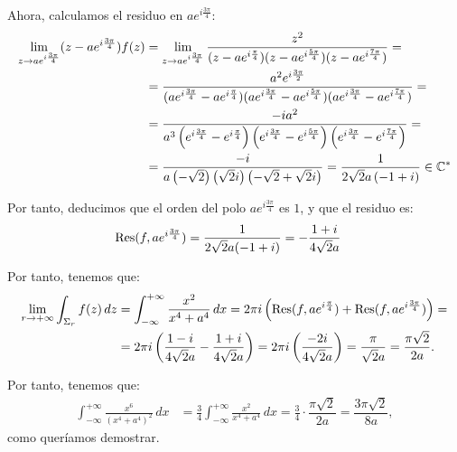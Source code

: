 \begin{ejercicio}
    Ahora, calculamos el residuo en $a e^{i\frac{3\pi}{4}}$:
    \begin{align*}
        \lim_{z\to a e^{i\frac{3\pi}{4}}} (z - a e^{i\frac{3\pi}{4}})f(z) &= \lim_{z\to a e^{i\frac{3\pi}{4}}} \frac{z^2}{(z-a e^{i\frac{\pi}{4}})(z-a e^{i\frac{5\pi}{4}})(z-a e^{i\frac{7\pi}{4}})}
        =\\&= \dfrac{a^2e^{i\frac{3\pi}{2}}}{(a e^{i\frac{3\pi}{4}} - a e^{i\frac{\pi}{4}})(a e^{i\frac{3\pi}{4}} - a e^{i\frac{5\pi}{4}})(a e^{i\frac{3\pi}{4}} - a e^{i\frac{7\pi}{4}})}
        =\\&= \dfrac{-ia^2}{a^3\left(e^{i\frac{3\pi}{4}} - e^{i\frac{\pi}{4}}\right)\left(e^{i\frac{3\pi}{4}} - e^{i\frac{5\pi}{4}}\right)\left(e^{i\frac{3\pi}{4}} - e^{i\frac{7\pi}{4}}\right)}
        =\\&= \dfrac{-i}{a\left(-\sqrt{2}\right)\left(\sqrt{2}i\right)\left(-\sqrt{2} + \sqrt{2}i\right)}
        = \dfrac{1}{2\sqrt{2}a\left(-1 + i\right)}\in \mathbb{C}^*
    \end{align*}

    Por tanto, deducimos que el orden del polo $a e^{i\frac{3\pi}{4}}$ es $1$, y que el residuo es:
    \begin{align*}
        \operatorname{Res}(f, a e^{i\frac{3\pi}{4}}) &= \dfrac{1}{2\sqrt{2}a(-1 + i)}
        = -\dfrac{1+i}{4\sqrt{2}a}
    \end{align*}

    Por tanto, tenemos que:
    \begin{align*}
        \lim_{r\to+\infty} \int_{\Sigma_r} f(z) \, dz &= \int_{-\infty}^{+\infty} \frac{x^2}{x^4 + a^4} \, dx
        = 2\pi i\left(\operatorname{Res}(f, a e^{i\frac{\pi}{4}}) + \operatorname{Res}(f, a e^{i\frac{3\pi}{4}})\right)
        =\\&= 2\pi i\left(\dfrac{1-i}{4\sqrt{2}a} - \dfrac{1+i}{4\sqrt{2}a}\right)
        = 2\pi i\left(\dfrac{-2i}{4\sqrt{2}a}\right)
        = \dfrac{\pi}{\sqrt{2}a} = \dfrac{\pi\sqrt{2}}{2a}.
    \end{align*}

    Por tanto, tenemos que:
    \begin{align*}
        \int_{-\infty}^{+\infty} \frac{x^6}{(x^4 + a^4)^2} \, dx &= \frac{3}{4}\int_{-\infty}^{+\infty} \frac{x^2}{x^4 + a^4} \, dx
        = \frac{3}{4}\cdot \dfrac{\pi\sqrt{2}}{2a}
        = \dfrac{3\pi\sqrt{2}}{8a},
    \end{align*}
    como queríamos demostrar.
\end{ejercicio}

